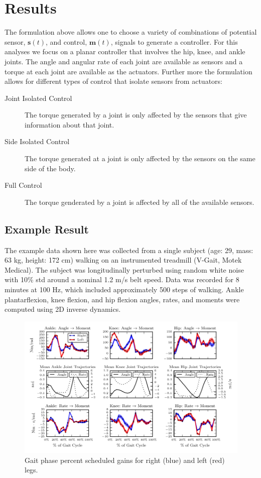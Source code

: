 \documentclass{article}
\begin{document}
\section*{Results}
%
The formulation above allows one to choose a variety of combinations of
potential sensor, $\mathbf{s}(t)$, and control, $\mathbf{m}(t)$, signals to
generate a controller. For this analyses we focus on a planar controller that
involves the hip, knee, and ankle joints. The angle and angular rate of each
joint are available as sensors and a torque at each joint are available as the
actuators. Further more the formulation allows for different types of control
that isolate sensors from actuators:

\begin{description}
  \item[Joint Isolated Control] The torque generated by a joint is only
    affected by the sensors that give information about that joint.
  \item[Side Isolated Control] The torque generated at a joint is only affected
    by the sensors on the same side of the body.
  \item[Full Control] The torque genderated by a joint is affected by all of
    the available sensors.
\end{description}

\subsection*{Example Result}
%
The example data shown here was collected from a single subject (age: 29, mass:
63 kg, height: 172 cm) walking on an instrumented treadmill (V-Gait, Motek
Medical). The subject was longitudinally perturbed using random white noise
with 10\% std around a nominal 1.2 m/s belt speed. Data was recorded for 8
minutes at 100 Hz, which included approximately 500 steps of walking. Ankle
plantarflexion, knee flexion, and hip flexion angles, rates, and moments were
computed using 2D inverse dynamics.
%
\begin{figure}
  \begin{center}
    \includegraphics{figures/example-identified-joint-isolated-gains.pdf}
    \caption{Gait phase percent scheduled gains for right (blue) and left (red) legs.}
    \label{fig:example-gains}
  \end{center}
\end{figure}
\end{document}
